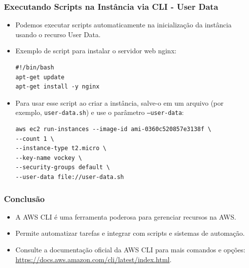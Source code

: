 \documentclass{beamer}
\begin{document}
   \begin{frame}[fragile]
      \frametitle{Executando Scripts na Instância via CLI - User Data}
      \begin{itemize}
         \item Podemos executar scripts automaticamente na inicialização da instância usando o recurso User Data.
         \item Exemplo de script para instalar o servidor web nginx:
         \begin{verbatim}
#!/bin/bash
apt-get update
apt-get install -y nginx
         \end{verbatim}
         \item Para usar esse script ao criar a instância, salve-o em um arquivo (por exemplo, \texttt{user-data.sh}) e use o parâmetro \texttt{--user-data}:
         \begin{verbatim}
aws ec2 run-instances --image-id ami-0360c520857e3138f \
--count 1 \
--instance-type t2.micro \
--key-name vockey \
--security-groups default \
--user-data file://user-data.sh
         \end{verbatim}
      \end{itemize}
   \end{frame} 

   \begin{frame}
      \frametitle{Conclusão}
      \begin{itemize}
         \item A AWS CLI é uma ferramenta poderosa para gerenciar recursos na AWS.
         \item Permite automatizar tarefas e integrar com scripts e sistemas de automação.
         \item Consulte a documentação oficial da AWS CLI para mais comandos e opções: \url{https://docs.aws.amazon.com/cli/latest/index.html}.
      \end{itemize}
   \end{frame} 
\end{document}
